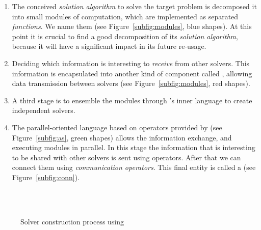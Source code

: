 \begin{enumerate}
\item The conceived \textit{solution algorithm} to solve the target problem is decomposed it into small modules of computation, which are implemented as separated {\it functions}. We name them \oms{} (see Figure~\ref{subfig:modules}, blue shapes). At this point it is crucial to find a good decomposition of its \textit{solution algorithm}, because it will have a significant impact in its future re-usage. 
\item Deciding which information is interesting to \textit{receive} from other solvers. This information is encapsulated into another kind of component called \opch, allowing data transmission between solvers (see Figure~\ref{subfig:modules}, red shapes).
\item A third stage is to ensemble the modules through \posl{}'s inner language %
to create independent solvers.
\item The parallel-oriented language based on operators provided by \posl{} (see Figure~\ref{subfig:as}, green shapes) allows the information exchange, and executing modules in parallel. In this stage the information that is interesting to be shared with other solvers is sent using operators. After that we can connect them using {\it communication operators}. This final entity is called a \INTROsoset{} (see Figure~\ref{subfig:conn}).
\end{enumerate}

\begin{figure}[h]
	\centering
	\\
	\\
	\caption[]{Solver construction process using \posl}
	\label{fig:posl}
\end{figure}


